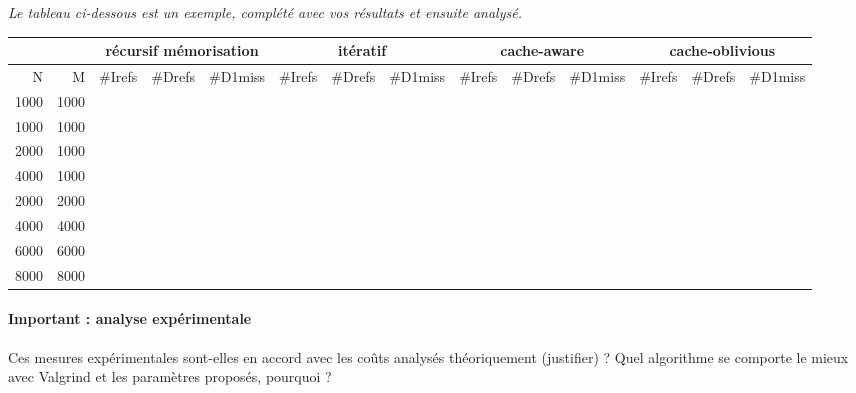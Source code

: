 \documentclass[10pt,a4paper]{article}
\begin{document}
{{\em Le tableau ci-dessous est un exemple, complété avec vos résultats et ensuite analysé.}
\\
{\footnotesize
\begin{tabular}{|r|r||r|r|r||r|r|r||r|r|r||r|r|r||}
\hline
 \multicolumn{2}{|c||}{ } 
& \multicolumn{3}{c||}{récursif mémorisation}
& \multicolumn{3}{c||}{itératif}
& \multicolumn{3}{c||}{cache-aware}
& \multicolumn{3}{c||}{cache-oblivious}
\\ \hline
N & M 
& \#Irefs & \#Drefs & \#D1miss %
& \#Irefs & \#Drefs & \#D1miss %
& \#Irefs & \#Drefs & \#D1miss %
& \#Irefs & \#Drefs & \#D1miss %
\\ \hline
\hline
1000 & 1000 
&  &  &   %
&  &  &   %
&  &  &   %
&  &  &   %
\\ \hline
1000 & 1000 
&  &  &   %
&  &  &   %
&  &  &   %
&  &  &   %
\\ \hline
2000 & 1000 
&  &  &   %
&  &  &   %
&  &  &   %
&  &  &   %
\\ \hline
4000 & 1000 
&  &  &   %
&  &  &   %
&  &  &   %
&  &  &   %
\\ \hline
2000 & 2000 
&  &  &   %
&  &  &   %
&  &  &   %
&  &  &   %
\\ \hline
4000 & 4000 
&  &  &   %
&  &  &   %
&  &  &   %
&  &  &   %
\\ \hline
6000 & 6000 
&  &  &   %
&  &  &   %
&  &  &   %
&  &  &   %
\\ \hline
8000 & 8000 
&  &  &   %
&  &  &   %
&  &  &   %
&  &  &   %
\\ \hline
\hline
\end{tabular}
}

\paragraph{Important : analyse expérimentale}
Ces mesures expérimentales sont-elles en accord avec les coûts analysés théoriquement (justifier) ? 
Quel algorithme se comporte le mieux avec Valgrind et les paramètres proposés, pourquoi ?

}
\end{document}
